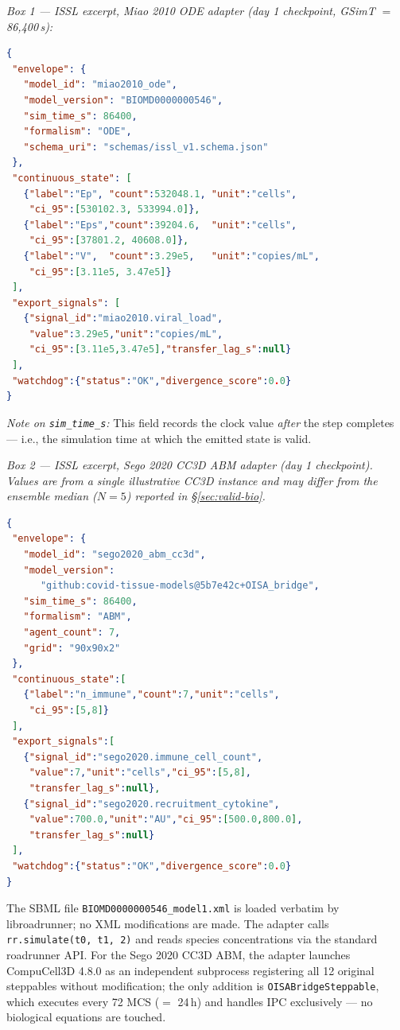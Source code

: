 \documentclass[conference,letterpaper,10pt]{IEEEtran}
\begin{document}
\textit{Box 1 --- ISSL excerpt, Miao 2010 ODE adapter (day 1 checkpoint,
GSimT $=$ 86{,}400\,s):}
\begin{lstlisting}[language=json]
{
 "envelope": {
   "model_id": "miao2010_ode",
   "model_version": "BIOMD0000000546",
   "sim_time_s": 86400,
   "formalism": "ODE",
   "schema_uri": "schemas/issl_v1.schema.json"
 },
 "continuous_state": [
   {"label":"Ep", "count":532048.1, "unit":"cells",
    "ci_95":[530102.3, 533994.0]},
   {"label":"Eps","count":39204.6,  "unit":"cells",
    "ci_95":[37801.2, 40608.0]},
   {"label":"V",  "count":3.29e5,   "unit":"copies/mL",
    "ci_95":[3.11e5, 3.47e5]}
 ],
 "export_signals": [
   {"signal_id":"miao2010.viral_load",
    "value":3.29e5,"unit":"copies/mL",
    "ci_95":[3.11e5,3.47e5],"transfer_lag_s":null}
 ],
 "watchdog":{"status":"OK","divergence_score":0.0}
}
\end{lstlisting}

\noindent \textit{Note on \texttt{sim\_time\_s}:} This field records the
clock value \emph{after} the step completes --- i.e., the simulation
time at which the emitted state is valid.

\medskip
\textit{Box 2 --- ISSL excerpt, Sego 2020 CC3D ABM adapter (day 1
checkpoint). Values are from a single illustrative CC3D instance and
may differ from the ensemble median ($N\!=\!5$) reported in
\S\ref{sec:valid-bio}.}
\begin{lstlisting}[language=json]
{
 "envelope": {
   "model_id": "sego2020_abm_cc3d",
   "model_version":
      "github:covid-tissue-models@5b7e42c+OISA_bridge",
   "sim_time_s": 86400,
   "formalism": "ABM",
   "agent_count": 7,
   "grid": "90x90x2"
 },
 "continuous_state":[
   {"label":"n_immune","count":7,"unit":"cells",
    "ci_95":[5,8]}
 ],
 "export_signals":[
   {"signal_id":"sego2020.immune_cell_count",
    "value":7,"unit":"cells","ci_95":[5,8],
    "transfer_lag_s":null},
   {"signal_id":"sego2020.recruitment_cytokine",
    "value":700.0,"unit":"AU","ci_95":[500.0,800.0],
    "transfer_lag_s":null}
 ],
 "watchdog":{"status":"OK","divergence_score":0.0}
}
\end{lstlisting}

The SBML file \texttt{BIOMD0000000546\_model1.xml} is loaded verbatim by
libroadrunner; no XML modifications are made. The adapter calls
\texttt{rr.simulate(t0,\,t1,\,2)} and reads species concentrations via
the standard roadrunner API. For the Sego 2020 CC3D ABM, the adapter
launches CompuCell3D 4.8.0 as an independent subprocess registering all
12 original steppables without modification; the only addition is
\texttt{OISABridgeSteppable}, which executes every 72 MCS ($=$ 24\,h)
and handles IPC exclusively --- no biological equations are touched.
\end{document}
